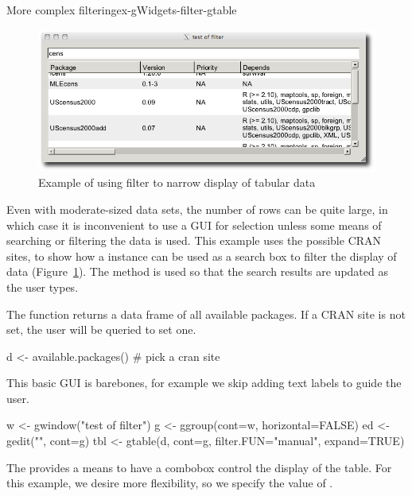 \begin{example}{More complex filtering}{ex-gWidgets-filter-gtable}

\begin{figure}
  \centering
  \includegraphics[width=.8\textwidth]{fig-gWidgets-filter-example}
  \caption{Example of using filter to narrow display of tabular data}
  \label{fig:gWidgets-filter-example}
\end{figure}

Even with moderate-sized data sets, the number of rows can be quite large, in which case it is
inconvenient to use a GUI for selection unless some means of searching or filtering the
data is used. This example uses the possible CRAN sites, to show how a
 instance can be used as a search box to filter the display of
data (Figure~\ref{fig:gWidgets-filter-example}). The  method is used so that the search
results are updated as the user types.


The  function returns a data frame of all
available packages. If a CRAN site is not set, the user will be
queried to set one.
\begin{Schunk}
\begin{Sinput}
 d <- available.packages()       # pick a cran site
\end{Sinput}
\end{Schunk}

This basic GUI is barebones, for example we skip adding text labels to guide the user. 
\begin{Schunk}
\begin{Sinput}
 w <- gwindow("test of filter")
 g <- ggroup(cont=w, horizontal=FALSE)
 ed <- gedit("", cont=g)
 tbl <- gtable(d, cont=g, filter.FUN="manual", expand=TRUE)
\end{Sinput}
\end{Schunk}
The  provides a means to have a combobox
control the display of the table. For this example, we desire more
flexibility, so we specify the value of .


\end{example}
